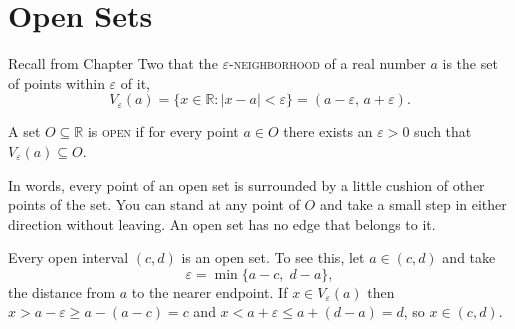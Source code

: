 \section{Open Sets}

Recall from Chapter Two that the \textsc{$\varepsilon$-neighborhood} of a real number $a$ is the set of points within $\varepsilon$ of it,
\[ V_{\varepsilon}(a) = \{x \in \mathbb{R} : |x - a| < \varepsilon\} = (a - \varepsilon,\, a + \varepsilon). \]

\begin{definition}\label{def:open}
A set $O \subseteq \mathbb{R}$ is \textsc{open} if for every point $a \in O$ there exists an $\varepsilon > 0$ such that $V_{\varepsilon}(a) \subseteq O$.
\end{definition}

In words, every point of an open set is surrounded by a little cushion of other points of the set.  You can stand at any point of $O$ and take a small step in either direction without leaving.    An open set has no edge that belongs to it.

\begin{example}
Every open interval $(c,d)$ is an open set.  To see this, let $a \in (c,d)$ and take
\[ \varepsilon = \min\{a - c,\; d - a\}, \]
the distance from $a$ to the nearer endpoint.  If $x \in V_{\varepsilon}(a)$ then $x > a - \varepsilon \geq a - (a - c) = c$ and $x < a + \varepsilon \leq a + (d - a) = d$, so $x \in (c,d)$.
\end{example}

\begin{marginfigure}
\centering
{}
\caption{The cushion around a point $a$ of $(c,d)$.  Its radius is the distance to the nearer endpoint.}
\end{marginfigure}

